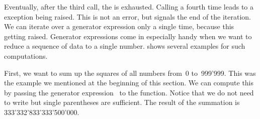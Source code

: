 Eventually, after the third  call, the  is exhausted.
Calling  a fourth time leads to a  exception being raised.
This is not an error, but signals the end of the iteration.
We can iterate over a generator expression only a single time, because this  getting raised.%
%
%
%
%
%
Generator expressions come in especially handy when we want to reduce a sequence of data to a single number.
 shows several examples for such computations.

First, we want to sum up the squares of all numbers from~0 to~999'999.
This was the example we mentioned at the beginning of this section.
We can compute this by passing the generator expression~ to the  function.
Notice that we do not need to write  but single parentheses are sufficient.
The result of the summation is 333'332'833'333'500'000.

